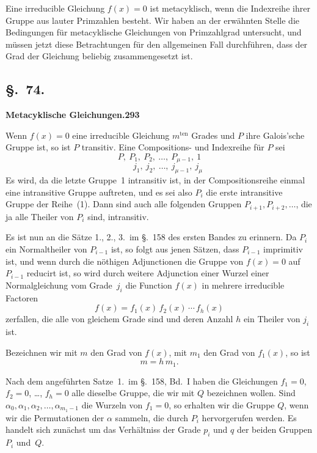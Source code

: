 \documentclass[12pt,a4paper]{article}
\begin{document}
Eine irreducible Gleichung $f(x)=0$ ist metacyklisch, wenn die Indexreihe ihrer Gruppe aus lauter Primzahlen besteht. Wir haben an der erw\"ahnten Stelle die Bedingungen f\"ur metacyklische Gleichungen von Primzahlgrad untersucht, und m\"ussen jetzt diese Betrachtungen f\"ur den allgemeinen Fall durchf\"uhren, dass der Grad der Gleichung beliebig zusammengesetzt ist.

\subsection*{\S.~74.}
\textbf{Metacyklische Gleichungen.}\hfill\textbf{293}\\[4pt]

Wenn $f(x)=0$ eine irreducible Gleichung $m^{\text{ten}}$ Grades und $P$ ihre Galois'sche Gruppe ist, so ist $P$ transitiv. Eine Compositions- und Indexreihe f\"ur $P$ sei
\begin{equation}
\tag{1}
P,\ P_1,\ P_2,\ \ldots,\ P_{\mu-1},\ 1
\end{equation}
\[
\qquad j_1,\ j_2,\ \ldots,\ j_{\mu-1},\ j_{\mu}
\]
Es wird, da die letzte Gruppe~1 intransitiv ist, in der Compositionsreihe einmal eine intransitive Gruppe auftreten, und es sei also $P_i$ die erste intransitive Gruppe der Reihe~(1). Dann sind auch alle folgenden Gruppen $P_{i+1},P_{i+2},\ldots$, die ja alle Theiler von $P_i$ sind, intransitiv.

Es ist nun an die S\"atze 1., 2., 3.\ im \S.~158 des ersten Bandes zu erinnern. Da $P_i$ ein Normaltheiler von $P_{i-1}$ ist, so folgt aus jenen S\"atzen, dass $P_{i-1}$ imprimitiv ist, und wenn durch die n\"othigen Adjunctionen die Gruppe von $f(x)=0$ auf $P_{i-1}$ reducirt ist, so wird durch weitere Adjunction einer Wurzel einer Normalgleichung vom Grade~$j_i$ die Function $f(x)$ in mehrere irreducible Factoren
\begin{equation}
\tag{2}
f(x) = f_1(x)\,f_2(x)\,\cdots\,f_h(x)
\end{equation}
zerfallen, die alle von gleichem Grade sind und deren Anzahl $h$ ein Theiler von $j_i$ ist.

Bezeichnen wir mit $m$ den Grad von $f(x)$, mit $m_1$ den Grad von $f_1(x)$, so ist
\begin{equation}
\tag{3}
m = h\,m_1.
\end{equation}

Nach dem angef\"uhrten Satze~1.\ im \S.~158, Bd.~I haben die Gleichungen $f_1=0$, $f_2=0$, \ldots, $f_h=0$ alle dieselbe Gruppe, die wir mit $Q$ bezeichnen wollen. Sind $\alpha_0,\alpha_1,\alpha_2,\ldots,\alpha_{m_1-1}$ die Wurzeln von $f_1=0$, so erhalten wir die Gruppe $Q$, wenn wir die Permutationen der $\alpha$ sammeln, die durch $P_i$ hervorgerufen werden. Es handelt sich zun\"achst um das Verh\"altniss der Grade $p_i$ und $q$ der beiden Gruppen $P_i$ und~$Q$.
\end{document}
